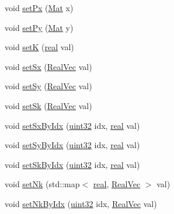 \begin{DoxyCompactItemize}
\item 
void \mbox{\hyperlink{classvd_a579df0c885a43bb876449889bbcba6cb}{set\+Px}} (\mbox{\hyperlink{typedefs_8h_a9fa28c1f74e909474857584f5c7b0088}{Mat}} x)
\item 
void \mbox{\hyperlink{classvd_a8314de29eacf72f10afee2c67b0c9819}{set\+Py}} (\mbox{\hyperlink{typedefs_8h_a9fa28c1f74e909474857584f5c7b0088}{Mat}} y)
\item 
void \mbox{\hyperlink{classvd_a7c692a97b49c4596c4ec1bc0a129b516}{setK}} (\mbox{\hyperlink{typedefs_8h_a58a0c7cf2501f4492da833421be92547}{real}} val)
\item 
void \mbox{\hyperlink{classvd_af83b298bdb5fcc3dd0b87bb8ed68e4a1}{set\+Sx}} (\mbox{\hyperlink{typedefs_8h_a84b6d9a0fbb45e01ad4a3aa5667f2992}{Real\+Vec}} val)
\item 
void \mbox{\hyperlink{classvd_a04c6f1cda87a3d18d8dfd67b9bf5f843}{set\+Sy}} (\mbox{\hyperlink{typedefs_8h_a84b6d9a0fbb45e01ad4a3aa5667f2992}{Real\+Vec}} val)
\item 
void \mbox{\hyperlink{classvd_af12cf5f79bb162b5ac163fd666498c30}{set\+Sk}} (\mbox{\hyperlink{typedefs_8h_a84b6d9a0fbb45e01ad4a3aa5667f2992}{Real\+Vec}} val)
\item 
void \mbox{\hyperlink{classvd_a440d47d94f489ceefa9037be51daef66}{set\+Sx\+By\+Idx}} (\mbox{\hyperlink{typedefs_8h_a8ad23e2333787a214e20a58a284a5a60}{uint32}} idx, \mbox{\hyperlink{typedefs_8h_a58a0c7cf2501f4492da833421be92547}{real}} val)
\item 
void \mbox{\hyperlink{classvd_a5407f9c20ed4ff2300ccbebb999d1dde}{set\+Sy\+By\+Idx}} (\mbox{\hyperlink{typedefs_8h_a8ad23e2333787a214e20a58a284a5a60}{uint32}} idx, \mbox{\hyperlink{typedefs_8h_a58a0c7cf2501f4492da833421be92547}{real}} val)
\item 
void \mbox{\hyperlink{classvd_a578ca6980896563397214c584401c7f5}{set\+Sk\+By\+Idx}} (\mbox{\hyperlink{typedefs_8h_a8ad23e2333787a214e20a58a284a5a60}{uint32}} idx, \mbox{\hyperlink{typedefs_8h_a58a0c7cf2501f4492da833421be92547}{real}} val)
\item 
void \mbox{\hyperlink{classvd_aa1a3d9448f6ff6f8076b15c9e9a63d7e}{set\+Nk}} (std\+::map$<$ \mbox{\hyperlink{typedefs_8h_a58a0c7cf2501f4492da833421be92547}{real}}, \mbox{\hyperlink{typedefs_8h_a84b6d9a0fbb45e01ad4a3aa5667f2992}{Real\+Vec}} $>$ val)
\item 
void \mbox{\hyperlink{classvd_aa45da38425cbd5b48f61313323ba6204}{set\+Nk\+By\+Idx}} (\mbox{\hyperlink{typedefs_8h_a8ad23e2333787a214e20a58a284a5a60}{uint32}} idx, \mbox{\hyperlink{typedefs_8h_a84b6d9a0fbb45e01ad4a3aa5667f2992}{Real\+Vec}} val)

\end{DoxyCompactItemize}
